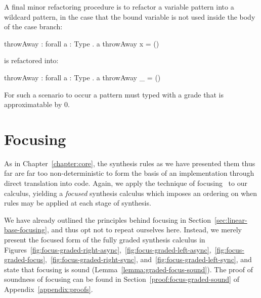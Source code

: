 A final minor refactoring procedure is to refactor a variable pattern into a
wildcard pattern, in the case that the bound variable is not used inside the
body of the case branch: 
\begin{granule}
throwAway : forall { a : Type } . a %
throwAway x = ()
\end{granule}
is refactored into: 
\begin{granule}
throwAway : forall { a : Type } . a %
throwAway _ = ()
\end{granule}
For such a scenario to occur a pattern must typed with a grade that is
approximatable by 0.


\section{Focusing}
\label{section:graded-base-focusing}
As in Chapter~\ref{chapter:core}, the synthesis rules as we have presented them
thus far are far too non-deterministic to form the basis of an
implementation through direct translation into code. Again, we apply the
technique of focusing~\citep{focusing} to our calculus, yielding a
\emph{focused} synthesis calculus which imposes an ordering on when rules may be
applied at each stage of synthesis. 

We have already outlined the principles behind focusing in
Section~\ref{sec:linear-base-focusing}, and thus opt not to repeat ourselves here.
Instead, we merely present the focused form of the fully graded synthesis
calculus in
Figures~\ref{fig:focus-graded-right-async},~\ref{fig:focus-graded-left-async},~\ref{fig:focus-graded-focus},~\ref{fig:focus-graded-right-sync}, and~\ref{fig:focus-graded-left-sync},
and state that focusing is sound (Lemma~\ref{lemma:graded-focus-sound}). The
proof of soundness of focusing can be found in Section~\ref{proof:focus-graded-sound} of
Appendix~\ref{appendix:proofs}.





